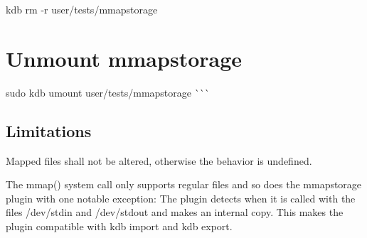 kdb rm -\/r user/tests/mmapstorage\hypertarget{autotoc_md429_autotoc_md440}{}\section{Unmount mmapstorage}\label{autotoc_md429_autotoc_md440}
sudo kdb umount user/tests/mmapstorage \`{}\`{}\`{}\hypertarget{autotoc_md429_autotoc_md441}{}\subsection{Limitations}\label{autotoc_md429_autotoc_md441}
Mapped files shall not be altered, otherwise the behavior is undefined.

The {\ttfamily mmap()} system call only supports regular files and so does the mmapstorage plugin with one notable exception\+: The plugin detects when it is called with the files {\ttfamily /dev/stdin} and {\ttfamily /dev/stdout} and makes an internal copy. This makes the plugin compatible with {\ttfamily kdb import} and {\ttfamily kdb export}. 